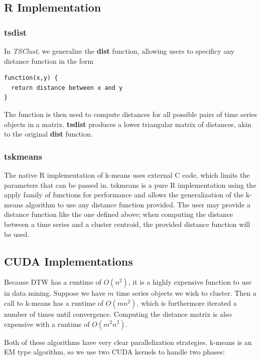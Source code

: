 \documentclass{article}
\begin{document}
\subsection{R Implementation}

\subsubsection{tsdist}

In \textit{TSClust}, we generalize the \textbf{dist} function, allowing users
to specificy any distance function in the form

\begin{verbatim}
function(x,y) {
  return distance between x and y
}
\end{verbatim}

The function is then used to compute distances for all possible pairs of 
time series objects in a matrix.  \textbf{tsdist} produces a lower triangular matrix 
of distances, akin to the original \textbf{dist} function.

\subsubsection{tskmeans}

The native R implementation of k-means uses external C code, which limits
the parameters that can be passed in.  tskmeans is a pure R implementation using
the apply family of functions for performance and allows the generalization of the 
k-means algorithm to use any distance function provided.  The user may provide a 
distance function like the one defined above; when computing the distance between 
a time series and a cluster centroid, the provided distance function will be used.

\subsection{CUDA Implementations}

Because DTW has a runtime of $O(n^2)$, it is a highly expensive function to use 
in data mining.  Suppose we have $m$ time series objects we wish to cluster.  
Then a call to k-means has a runtime of $O(mn^2)$, which is furthermore iterated
a number of times until convergence.  Computing the distance matrix is also 
expensive with a runtime of $O(m^2n^2)$.

Both of these algorithms have very clear parallelization strategies.  k-means 
is an EM type algorithm, so we use two CUDA kernels to handle two phases:
\end{document}
